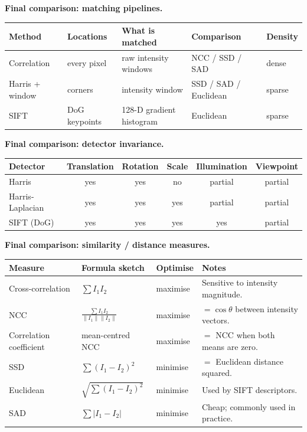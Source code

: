 \textbf{Final comparison: matching pipelines.}

\begin{center}
\renewcommand{\arraystretch}{1.3}
\begin{tabular}{@{} l l l l l @{}}
\toprule
\textbf{Method} & \textbf{Locations} & \textbf{What is matched} & \textbf{Comparison} & \textbf{Density} \\
\midrule
Correlation & every pixel & raw intensity windows & NCC / SSD / SAD & dense \\
Harris + window & corners & intensity window & SSD / SAD / Euclidean & sparse \\
SIFT & DoG keypoints & 128-D gradient histogram & Euclidean & sparse \\
\bottomrule
\end{tabular}
\end{center}

\textbf{Final comparison: detector invariance.}

\begin{center}
\renewcommand{\arraystretch}{1.3}
\begin{tabular}{@{} l c c c c c @{}}
\toprule
\textbf{Detector} & \textbf{Translation} & \textbf{Rotation} & \textbf{Scale} & \textbf{Illumination} & \textbf{Viewpoint} \\
\midrule
Harris & yes & yes & no & partial & partial \\
Harris-Laplacian & yes & yes & yes & partial & partial \\
SIFT (DoG) & yes & yes & yes & yes & partial \\
\bottomrule
\end{tabular}
\end{center}

\textbf{Final comparison: similarity / distance measures.}

\begin{center}
\renewcommand{\arraystretch}{1.3}
\begin{tabular}{@{} l l l l @{}}
\toprule
\textbf{Measure} & \textbf{Formula sketch} & \textbf{Optimise} & \textbf{Notes} \\
\midrule
Cross-correlation & $\sum I_1 I_2$ & maximise & Sensitive to intensity magnitude. \\
NCC & $\frac{\sum I_1 I_2}{\|I_1\|\|I_2\|}$ & maximise & $= \cos\theta$ between intensity vectors. \\
Correlation coefficient & mean-centred NCC & maximise & $=$ NCC when both means are zero. \\
SSD & $\sum (I_1-I_2)^2$ & minimise & $=$ Euclidean distance squared. \\
Euclidean & $\sqrt{\sum (I_1-I_2)^2}$ & minimise & Used by SIFT descriptors. \\
SAD & $\sum |I_1-I_2|$ & minimise & Cheap; commonly used in practice. \\
\bottomrule
\end{tabular}
\end{center}
